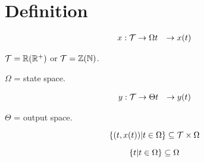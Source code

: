 \section{Definition}

\begin{definition}
    \[
        \begin{aligned}
            x : \mathcal{T} &\to \Omega
            t &\rightarrow x(t)
        \end{aligned}            
    \]
\end{definition}

$\mathcal{T} = \mathbb{R} (\mathbb{R}^+)$ or $\mathcal{T} = \mathbb{Z} (\mathbb{N})$.

$\Omega$ = state space.

\begin{definition}[Observation]
    \[
        \begin{aligned}
            y : \mathcal{T} &\to \Theta
            t &\rightarrow y(t)
        \end{aligned}            
    \]
\end{definition}

$\Theta$ = output space.

\begin{definition}[Trajectory]
    \[
        \left\{  (t, x(t)) \vert t\in \Omega  \right\} \subseteq \mathcal{T} \times \Omega
    \]
\end{definition}

\begin{definition}[Orbit]
    \[
        \left\{  t \vert t\in \Omega  \right\} \subseteq \Omega
    \]
\end{definition}